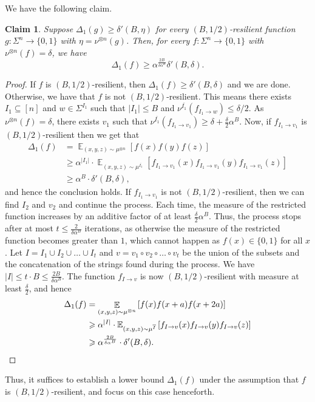 \documentclass[10pt,a4paper]{amsart}
\newtheorem{claim}[thm]{Claim}
\newcommand\E{\mathbb{E}}
\newcommand\Expect[2]{{\mathop{\mathbb{E}}_{#1}\left[ {#2} \right]}}
\renewcommand\geq{\geqslant}
\renewcommand\leq{\leqslant}
\newcommand{\V}[1]{{#1}}
\begin{document}
We have the following claim.
\begin{claim}\label{claim:making_f_resilient}
    Suppose $\Delta_1(g) \geq \delta'(B, \eta)$ for every $(B,1/2)$-resilient function $g: \Sigma^n \rightarrow \{0,1\}$ with $\eta =\nu^{\otimes n}(g)$. Then, for every $f: \Sigma^n \rightarrow \{0,1\}$ with $\nu^{\otimes n}(f) = \delta$, we have
    $$\Delta_1(f)\geq  \alpha^{\frac{2B}{\delta\alpha^B}}\delta'(B, \delta).$$ 
\end{claim}
\begin{proof}
If $f$ is $(B, 1/2)$-resilient, then $\Delta_1(f)\geq \delta'(B, \delta)$ and we are done. Otherwise, we have that $f$ is not $(B, 1/2)$-resilient. This means there exists $I_1\subseteq [n]$ and $w\in \Sigma^{I_1}$ such that $|I_1|\leq B$ and $\nu^{\bar{I_1}}(f_{I_1\rightarrow w}) \leq \delta/2$. As $\nu^{\otimes n}(f) = \delta$, there exists $v_1$ such that $\nu^{\bar{I_1}}(f_{I_1\rightarrow v_1}) \geq \delta + \frac{\delta}{2}\alpha^{B}$. Now, if $f_{I_1\rightarrow v_1}$ is $(B, 1/2)$-resilient then we get that 
\begin{align*}
    \Delta_1(f) &= \Expect{(\V x, \V y, \V z)\sim \mu^{\otimes n}}{f(\V x) f(\V y) f(\V z)}\\
    & \geq \alpha^{|I_1|}\cdot  \Expect{(\V x, \V y, \V z)\sim \mu^{\overline{I_1}}}{ f_{I_1\rightarrow v_1}(\V x) f_{I_1\rightarrow v_1}(\V y) f_{I_1\rightarrow v_1}(\V z)}\\
    &\geq \alpha^{B}\cdot \delta'(B, \delta),
\end{align*}
and hence the conclusion holds. If $f_{I_1\rightarrow v_1}$ is not $(B, 1/2)$-resilient, then we can find $I_2$ and $v_2$ and continue the process. Each time, the measure of the restricted function increases by an additive factor of at least $\frac{\delta}{2}\alpha^B$. Thus, the process stops after at most $t\leq \frac{2}{\delta\alpha^B}$ iterations, as otherwise the measure of the restricted function becomes greater than $1$, which cannot happen as $f(\V x)\in \{0,1\}$ for all $\V x$. Let $I = I_1\cup I_2\cup \ldots \cup I_t$ and $v=v_1\circ v_2\circ \ldots \circ v_t$ be the union of the subsets and the concatenation of the strings found during the process. We have $|I|\leq t\cdot B \leq  \frac{2B}{\delta\alpha^B}$. The function $f_{I\rightarrow v}$ is now $(B, 1/2)$-resilient with measure at least $\frac{\delta}{2}$, and hence
\begin{align*}
    \Delta_1(f) &= \Expect{(\V x, \V y, \V z)\sim \mu^{\otimes n}}{f(\V x) f(\V x+\V a) f(\V x+2\V a)}\\
    & \geq \alpha^{|I|}\cdot \E_{(\V x, \V y, \V z)\sim \mu^{\overline{I}}}\left[ f_{I\rightarrow v}(\V x) f_{I\rightarrow v}(\V y) f_{I\rightarrow v}(\V z)\right]\\
    &\geq \alpha^{\frac{2B}{\delta\alpha^B}}\cdot \delta'(B, \delta).
    \qedhere
\end{align*}
\end{proof}
Thus, it suffices to establish a lower bound $\Delta_1(f)$ under the assumption that $f$ is $(B, 1/2)$-resilient, and focus on this case henceforth.
\end{document}
